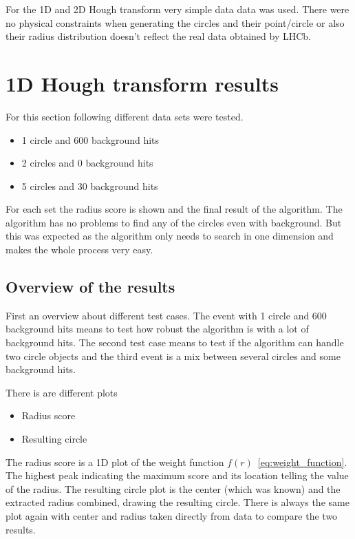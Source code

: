 \documentclass[11pt,twoside]{scrreprt}
\begin{document}
For the 1D and 2D Hough transform very simple data data was used. There were 
no physical constraints when generating the circles and their point/circle
or also their radius distribution doesn't reflect the real data obtained
by LHCb.

\section{1D Hough transform results} %
\label{sec:1d_hough_transform_results}
For this section following different data sets were tested.
\begin{itemize}
  \item 1 circle and 600 background hits
  \item 2 circles and 0 background hits
  \item 5 circles and 30 background hits
\end{itemize}

For each set the radius score is shown and the final result of the algorithm.
The algorithm has no problems to find any of the circles even with background.
But this was expected as the algorithm only needs to search in one dimension
and makes the whole process very easy.

\subsection{Overview of the results} %
\label{sub:1d_overview_of_the_results}
First an overview about different test cases. The event with 1 circle and 600
background hits means to test how robust the algorithm is with a lot of
background hits. The second test case means to test if the algorithm can 
handle two circle objects and the third event is a mix between several
circles and some background hits.

There is are different plots
\begin{itemize}
  \item Radius score
  \item Resulting circle
\end{itemize}

The radius score is a 1D plot of the weight function $f(r)$~\ref{eq:weight_function}. The highest peak
indicating the maximum score and its location telling the value of the radius.
The resulting circle plot is the center (which was known) and the extracted radius combined, drawing the resulting circle. There is always the same plot
again with center and radius taken directly from data to compare the two results.
\end{document}
